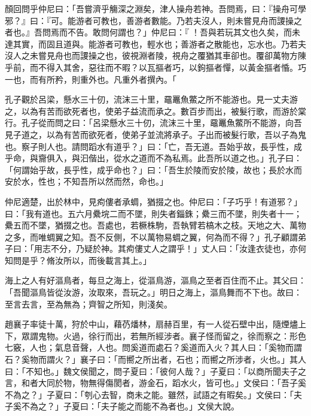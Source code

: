 \begin{pinyinscope}
顏回問乎仲尼曰：「吾嘗濟乎觴深之淵矣，津人操舟若神。吾問焉，曰：『操舟可學邪？』曰：『可。能游者可教也，善游者數能。乃若夫沒人，則未嘗見舟而謖操之者也。』吾問焉而不告。敢問何謂也？」仲尼曰：『𧮒！吾與若玩其文也久矣，而未達其實，而固且道與。能游者可教也，輕水也；善游者之散能也，忘水也。乃若夫沒人之未嘗見舟也而謖操之也，彼視淵者陵，視舟之覆猶其車卻也。覆卻萬物方陳乎前，而不得入其舍，惡往而不暇？以瓦摳者巧，以鉤摳者憚，以黃金摳者惛。巧一也，而有所矜，則重外也。凡重外者撰內。「

孔子觀於呂梁，懸水三十仞，流沫三十里，黿鼉魚鱉之所不能游也。見一丈夫游之，以為有苦而欲死者也，使弟子益流而承之。數百步而出，被髮行歌，而游於棠行。孔子從而問之曰：「呂梁懸水三十仞，流沫三十里，黿鼉魚鱉所不能游，向吾見子道之，以為有苦而欲死者，使弟子並流將承子。子出而被髮行歌，吾以子為鬼也。察子則人也。請問蹈水有道乎？」曰：「亡，吾无道。吾始乎故，長乎性，成乎命，與齎俱入，與汩偕出，從水之道而不為私焉。此吾所以道之也。」孔子曰：「何謂始乎故，長乎性，成乎命也？」曰：「吾生於陵而安於陵，故也；長於水而安於水，性也；不知吾所以然而然，命也。」

仲尼適楚，出於林中，見痀僂者承蜩，猶掇之也。仲尼曰：「子巧乎！有道邪？」曰：「我有道也。五六月纍垸二而不墜，則失者錙銖；纍三而不墜，則失者十一；纍五而不墜，猶掇之也。吾處也，若橛株駒，吾執臂若槁木之枝。天地之大、萬物之多，而唯蜩翼之知。吾不反側，不以萬物易蜩之翼，何為而不得？」孔子顧謂弟子曰：「用志不分，乃疑於神。其痀僂丈人之謂乎！」丈人曰：「汝逢衣徒也，亦何知問是乎？脩汝所以，而後載言其上。」

海上之人有好漚鳥者，每旦之海上，從漚鳥游，漚鳥之至者百住而不止。其父曰：「吾聞漚鳥皆從汝游，汝取來，吾玩之。」明日之海上，漚鳥舞而不下也。故曰：至言去言，至為無為；齊智之所知，則淺矣。

趙襄子率徒十萬，狩於中山，藉芿燔林，扇赫百里，有一人從石壁中出，隨煙燼上下，眾謂鬼物。火過，徐行而出，若無所經涉者。襄子怪而留之，徐而察之：形色七竅，人也；氣息音聲，人也。問奚道而處石？奚道而入火？其人曰：「奚物而謂石？奚物而謂火？」襄子曰：「而嚮之所出者，石也；而嚮之所涉者，火也。」其人曰：「不知也。」魏文侯聞之，問子夏曰：「彼何人哉？」子夏曰：「以商所聞夫子之言，和者大同於物，物無得傷閡者，游金石，蹈水火，皆可也。」文侯曰：「吾子奚不為之？」子夏曰：「刳心去智，商未之能。雖然，試語之有暇矣。」文侯曰：「夫子奚不為之？」子夏曰：「夫子能之而能不為者也。」文侯大說。


\end{pinyinscope}
